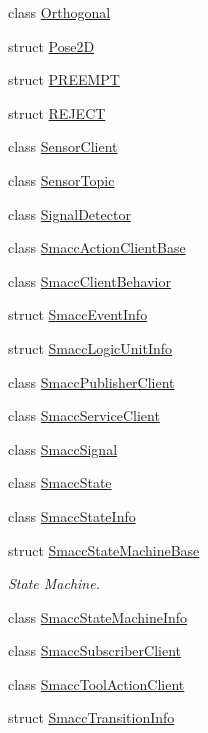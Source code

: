 \begin{DoxyCompactItemize}
\item 
class \hyperlink{classsmacc_1_1Orthogonal}{Orthogonal}
\item 
struct \hyperlink{structsmacc_1_1Pose2D}{Pose2D}
\item 
struct \hyperlink{structsmacc_1_1PREEMPT}{P\+R\+E\+E\+M\+PT}
\item 
struct \hyperlink{structsmacc_1_1REJECT}{R\+E\+J\+E\+CT}
\item 
class \hyperlink{classsmacc_1_1SensorClient}{Sensor\+Client}
\item 
class \hyperlink{classsmacc_1_1SensorTopic}{Sensor\+Topic}
\item 
class \hyperlink{classsmacc_1_1SignalDetector}{Signal\+Detector}
\item 
class \hyperlink{classsmacc_1_1SmaccActionClientBase}{Smacc\+Action\+Client\+Base}
\item 
class \hyperlink{classsmacc_1_1SmaccClientBehavior}{Smacc\+Client\+Behavior}
\item 
struct \hyperlink{structsmacc_1_1SmaccEventInfo}{Smacc\+Event\+Info}
\item 
struct \hyperlink{structsmacc_1_1SmaccLogicUnitInfo}{Smacc\+Logic\+Unit\+Info}
\item 
class \hyperlink{classsmacc_1_1SmaccPublisherClient}{Smacc\+Publisher\+Client}
\item 
class \hyperlink{classsmacc_1_1SmaccServiceClient}{Smacc\+Service\+Client}
\item 
class \hyperlink{classsmacc_1_1SmaccSignal}{Smacc\+Signal}
\item 
class \hyperlink{classsmacc_1_1SmaccState}{Smacc\+State}
\item 
class \hyperlink{classsmacc_1_1SmaccStateInfo}{Smacc\+State\+Info}
\item 
struct \hyperlink{structsmacc_1_1SmaccStateMachineBase}{Smacc\+State\+Machine\+Base}
\begin{DoxyCompactList}\small\item\em State Machine. \end{DoxyCompactList}\item 
class \hyperlink{classsmacc_1_1SmaccStateMachineInfo}{Smacc\+State\+Machine\+Info}
\item 
class \hyperlink{classsmacc_1_1SmaccSubscriberClient}{Smacc\+Subscriber\+Client}
\item 
class \hyperlink{classsmacc_1_1SmaccToolActionClient}{Smacc\+Tool\+Action\+Client}
\item 
struct \hyperlink{structsmacc_1_1SmaccTransitionInfo}{Smacc\+Transition\+Info}

\end{DoxyCompactItemize}
